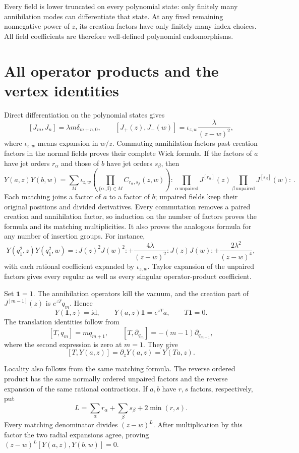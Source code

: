 Every field is lower truncated on every polynomial state: only
finitely many annihilation modes can differentiate that state.
At any fixed remaining nonnegative power of $z$, its creation factors
have only finitely many index choices.  All field coefficients are
therefore well-defined polynomial endomorphisms.

\section{All operator products and the vertex identities}

Direct differentiation on the polynomial states gives
\[
 [J_m,J_n]=\lambda m\delta_{m+n,0},\qquad
 [J_+(z),J_-(w)]=\iota_{z,w}\frac\lambda{(z-w)^2},
\]
where $\iota_{z,w}$ means expansion in $w/z$.
Commuting annihilation factors past creation factors in the normal
fields proves their complete Wick formula.  If the factors of $a$
have jet orders $r_\alpha$ and those of $b$ have jet orders $s_\beta$,
then
\[
 Y(a,z)Y(b,w)=
 \sum_M\iota_{z,w}\left(
          \prod_{\{\alpha,\beta\}\in M}
                        C_{r_\alpha,s_\beta}(z,w)\right)
       :\!\prod_{\alpha\ \mathrm{unpaired}}J^{[r_\alpha]}(z)
          \prod_{\beta\ \mathrm{unpaired}}J^{[s_\beta]}(w)\!:\ .
\]
Each matching joins a factor of $a$ to a factor of $b$; unpaired
fields keep their original positions and divided derivatives.
Every commutation removes a paired creation and annihilation factor,
so induction on the number of factors proves the formula and its
matching multiplicities.  It also proves the analogous formula for
any number of insertion groups.  For instance,
\[
 Y(q_1^2,z)Y(q_1^2,w)
 =:J(z)^2J(w)^2:
   +\frac{4\lambda}{(z-w)^2}:J(z)J(w):
   +\frac{2\lambda^2}{(z-w)^4},
\]
with each rational coefficient expanded by $\iota_{z,w}$.
Taylor expansion of the unpaired factors gives every regular as well
as every singular operator-product coefficient.

Set $\mathbf1=1$.  The annihilation operators kill the vacuum, and
the creation part of $J^{[m-1]}(z)$ is $e^{zT}q_m$.  Hence
\[
 Y(\mathbf1,z)=\mathrm{id},\qquad
 Y(a,z)\mathbf1=e^{zT}a,
 \qquad T\mathbf1=0.
\]
The translation identities follow from
\[
 [T,q_m]=m q_{m+1},\qquad
 [T,\partial_{q_m}]=-(m-1)\partial_{q_{m-1}},
\]
where the second expression is zero at $m=1$.  They give
\[
 [T,Y(a,z)]=\partial_zY(a,z)=Y(Ta,z).
\]

Locality also follows from the same matching formula.  The reverse
ordered product has the same normally ordered unpaired factors and
the reverse expansion of the same rational contractions.  If $a,b$
have $r,s$ factors, respectively, put
\[
 L=\sum_\alpha r_\alpha+\sum_\beta s_\beta+2\min(r,s).
\]
Every matching denominator divides $(z-w)^L$.  After multiplication
by this factor the two radial expansions agree, proving
$(z-w)^L[Y(a,z),Y(b,w)]=0$.

